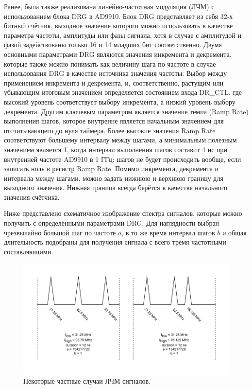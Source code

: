 \documentclass[rusmathsym, eqnumwithinsec, amspack, hyperref]{bomgost}
\begin{document}
Ранее, была также реализована линейно-частотная модуляция (ЛЧМ) с использованием блока DRG в AD9910. Блок DRG представляет из себя 32-х битный счётчик, выходное значение которого можно использовать в качестве параметра частоты, амплитуды или фазы сигнала, хотя в случае с амплитудой и фазой задействованы только 16 и 14 младших бит соответственно. Двумя основными параметрами DRG являются значения инкремента и декремента, которые также можно понимать как величину шага по частоте в случае использования DRG в качестве источника значения частоты. Выбор между применением инкремента и декремента, и, соответственно, растущим или убывающим итоговым значением определяется состоянием входа DR\_CTL, где высокий уровень соответствует выбору инкремента, а низкий уровень выбору декремента. Другим ключевым параметром является значение темпа (Ramp Rate) выполнения шагов, которое внутренне является начальным значением для отсчитывающего до нуля таймера. Более высокие значения Ramp Rate соответствуют большему интервалу между шагами, а минимальным полезным значением является 1, когда интервал выполнения шагов составит 4 нс при внутренней частоте AD9910 в 1 ГГц; шагов не будет происходить вообще, если записать ноль в регистр Ramp Rate. Помимо инкремента, декремента и интервала между шагами, можно задать нижнюю и верхнюю границу для выходного значения. Нижняя граница всегда берётся в качестве начального значения счётчика.

Ниже представлено схематичное изображение спектра сигналов, которые можно получить с определёнными параметрами DRG. Для наглядности выбран чрезвычайно большой шаг по частоте $a$, в то же время интервал шагов $b$ и общая длительность подобраны для получения сигнала с всего тремя частотными составляющими.

%
%
\begin{gostfigure}
\begin{figure}[H]
\centering
\includegraphics{data/sweep_edge_cases.drawio.pdf}
\caption{Некоторые частные случаи ЛЧМ сигналов.}
\label{fig:sweep_edge_cases}
\end{figure}
\end{gostfigure}
\end{document}
